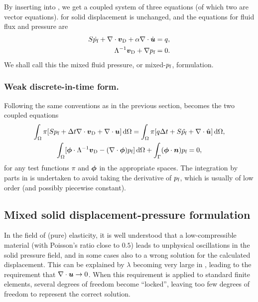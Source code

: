 By inserting  into , we get a coupled system of three
equations (of which two are vector equations).  for solid
displacement is unchanged, and the equations for fluid flux and pressure are
\begin{align}
\label{eq:simp1}
S\dot{p_{\text{f}}} + \nabla \cdot \boldsymbol{v}_{\text{D}} + \alpha \nabla \cdot \dot{\boldsymbol{u}} &= q, \\
\label{eq:simp2}
  \Lambda^{-1} \boldsymbol{v}_{\text{D}} + \nabla p_{\text{f}} &= 0.
\end{align}
We shall call this the mixed fluid pressure, or mixed-$p_{\text{f}}$, formulation.

\subsubsection*{Weak discrete-in-time form.}

Following the same conventions as in the previous section, 
becomes the two coupled equations
\begin{gather}
  \label{eq:weakpressmix}
  \int_\Omega \pi[
  S \Pf +
  \Delta t \nabla \cdot \vD
  + \nabla \cdot \U
  ] \D\Omega 
  = \int_\Omega \pi[
  q \Delta t
  + S \prev{\Pf}
  + \nabla \cdot \prev{\U}] \D\Omega,\\
%
\label{eq:weakdarcy}
  \int_\Omega [
  \V{\phi} \cdot \Lambda^{-1}\vD - (\nabla \cdot \V{\phi})\Pf
  ]  \D\Omega
  + \int_\Gamma (\V{\phi}\cdot \V{n}) \Pf = 0,
\end{gather}
for any test functions $\pi$ and $\boldsymbol{\phi}$ in the appropriate spaces.
The integration by parts in  is undertaken to avoid
taking the derivative of $p_{\text{f}}$, which is usually of low order (and possibly
piecewise constant).

\subsection{Mixed solid displacement-pressure formulation}

In the field of (pure) elasticity, it is well understood that a
low-compressible material (with Poisson's ratio close to $0.5$) leads to
unphysical oscillations in the solid pressure field, and in some cases also to
a wrong solution for the calculated displacement.
This can be explained by $\lambda$ becoming very large in , leading to
the requirement that $\nabla\cdot\boldsymbol{u}\rightarrow 0$.
When this requirement is applied to standard finite elements, several degrees
of freedom become ``locked'', leaving too few degrees of freedom to represent
the correct solution.

